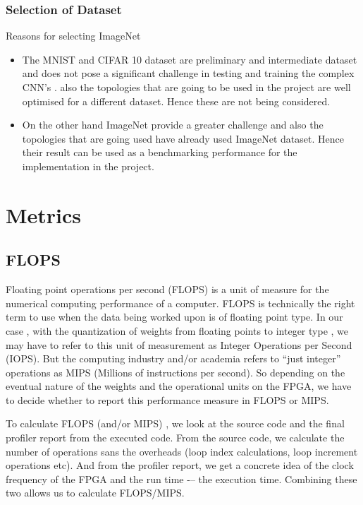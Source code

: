 \documentclass[titlepage]{report}
\begin{document}
\subsection{Selection of Dataset}
Reasons for selecting ImageNet
\begin{itemize}
    \item The MNIST and CIFAR 10 dataset are preliminary and intermediate dataset and does not pose a significant challenge in testing and training the complex CNN’s . also the topologies that are going to be used in the project are well optimised for a different dataset. Hence these are not being considered.
    \item On the other hand ImageNet provide a greater challenge and also the topologies that are going used have already used ImageNet dataset. Hence their result can be used as a benchmarking performance for the implementation in the project.
\end{itemize}




\chapter{Metrics}

\section{FLOPS}
Floating point operations per second (FLOPS) is a  unit of measure for the numerical computing performance of a computer. FLOPS is technically the right term to use when the data being worked upon is of floating point type.
In our case , with the quantization of weights from floating points  to integer type , we may have to refer to this unit of measurement as Integer Operations per Second (IOPS).
But the computing  industry and/or academia refers to ``just integer'' operations as MIPS (Millions of instructions per second). So depending on the eventual nature of the weights and the operational units on the FPGA,
we have to decide whether to report this performance measure in FLOPS or MIPS.  

To calculate FLOPS (and/or MIPS) , we look at the source code and the final profiler report from the executed code.
From the source code, we calculate the number of operations sans the overheads (loop index calculations, loop increment operations etc). And from the profiler report, we get a concrete idea of the clock frequency of the FPGA and the run time -– the execution time. Combining these two allows us to calculate  FLOPS/MIPS.
\end{document}
